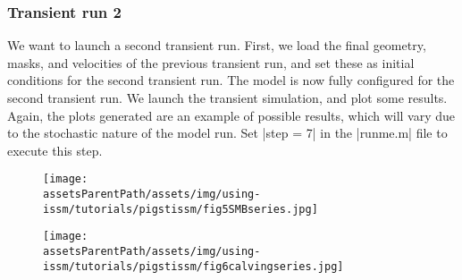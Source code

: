 \subsubsection{Transient run 2}%
We want to launch a second transient run. First, we load the final geometry, masks, and velocities of the previous transient run, and set these as initial conditions for the second transient run. The model is now fully configured for the second transient run. We launch the transient simulation, and plot some results. Again, the plots generated are an example of possible results, which will vary due to the stochastic nature of the model run.
Set \lstinlinebg|step = 7| in the \lstinlinebg|runme.m| file to execute this step.
\begin{figure}[hbt!]
	\begin{center}
		\texttt{[image: \\assetsParentPath/assets/img/using-issm/tutorials/pigstissm/fig5SMBseries.jpg]}
	\end{center}
\end{figure}
\begin{figure}[hbt!]
	\begin{center}
		\texttt{[image: \\assetsParentPath/assets/img/using-issm/tutorials/pigstissm/fig6calvingseries.jpg]}
	\end{center}
\end{figure}

\clearpage %

